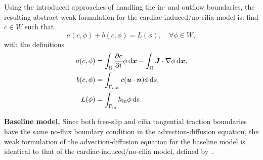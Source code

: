 \documentclass{WileyMSP-template}
\begin{document}
Using the introduced approaches of handling the in- and outflow boundaries,
the resulting abstract weak formulation for the cardiac-induced/no-cilia model is:
find $c\in W$ such that
\begin{equation}
    a(c, \phi) + b(c, \phi) = L(\phi), \quad\forall\phi\in W, \label{eq:adv_diff_weak_formB}
\end{equation}
with the definitions
\begin{align}
    a(c, \phi) &= \int_{\Omega}\frac{\partial c}{\partial t}\phi \, \mathrm d\bm{x} - \int_{\Omega}\bm{J}\cdot\nabla\phi \, \mathrm d\bm{x},
    \label{eq:adv_diff_bilinear_form}\\
    b(c, \phi) &= \int_{\Gamma_{\mathrm{out}}}c(\bm{u}\cdot\bm{n})\phi \, \mathrm ds, \label{eq:adv_diff_skew_form} \\
    L(\phi) &= \int_{\Gamma_{\mathrm{in}}}h_{\mathrm{in}}\phi \, \mathrm ds.\label{eq:adv_diff_linear_form}
\end{align}

\textbf{Baseline model.} Since both free-slip and cilia tangential
traction boundaries have the same no-flux boundary condition
in the advection-diffusion equation, the weak formulation of
the advection-diffusion equation for the baseline model is
identical to that of the cardiac-induced/no-cilia model,
defined by~.
\end{document}
